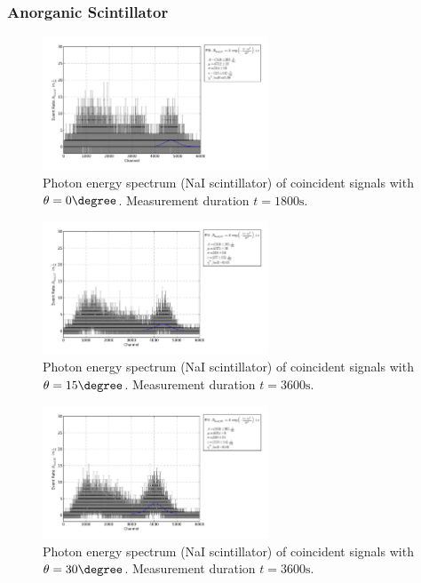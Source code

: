 \subsubsection{Anorganic Scintillator}
\begin{figure}[h!]
  \centering
  \includegraphics[width=0.6\textwidth]{plots/naj_0.png}
  \caption{Photon energy spectrum (NaI scintillator) of coincident signals
  with $\theta=0\degree$. Measurement duration $t=1800\mathrm{s}$.}
  \label{fig:naj0}
\end{figure}
\begin{figure}[h!]
  \centering
  \includegraphics[width=0.6\textwidth]{plots/naj_15.png}
  \caption{Photon energy spectrum (NaI scintillator) of coincident signals
  with $\theta=15\degree$. Measurement duration $t=3600\mathrm{s}$.}
  \label{fig:naj15}
\end{figure}
\begin{figure}[h!]
  \centering
  \includegraphics[width=0.6\textwidth]{plots/naj_30.png}
  \caption{Photon energy spectrum (NaI scintillator) of coincident signals
  with $\theta=30\degree$. Measurement duration $t=3600\mathrm{s}$.}
  \label{fig:naj30}
\end{figure}
